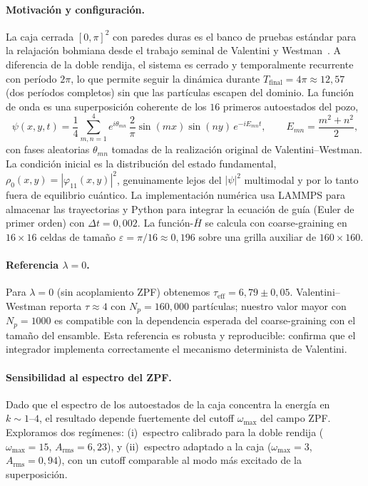 \documentclass[11pt,a4paper]{article}
\begin{document}
\paragraph{Motivación y configuración.}
La caja cerrada $[0,\pi]^2$ con paredes duras es el banco de pruebas
estándar para la relajación bohmiana desde el trabajo seminal de
Valentini y Westman~\cite{ValentiniWestman2005}. A diferencia de la
doble rendija, el sistema es cerrado y temporalmente recurrente con
período $2\pi$, lo que permite seguir la dinámica durante
$T_\text{final}=4\pi\approx 12{,}57$ (dos períodos completos) sin que
las partículas escapen del dominio. La función de onda es una
superposición coherente de los $16$ primeros autoestados del pozo,
\begin{equation}
\psi(x,y,t)=\frac{1}{4}\sum_{m,n=1}^{4}e^{i\theta_{mn}}\,
\frac{2}{\pi}\sin(mx)\sin(ny)\,e^{-iE_{mn}t},
\qquad
E_{mn}=\frac{m^2+n^2}{2},
\label{eq:psi_caja}
\end{equation}
con fases aleatorias $\theta_{mn}$ tomadas de la realización original
de Valentini--Westman. La condición inicial es la distribución del
estado fundamental, $\rho_0(x,y)=|\varphi_{11}(x,y)|^2$, genuinamente
lejos del $|\psi|^2$ multimodal y por lo tanto fuera de equilibrio
cuántico. La implementación numérica usa LAMMPS para almacenar las
trayectorias y Python para integrar la ecuación de guía (Euler de
primer orden) con $\Delta t=0{,}002$. La función-$\bar{H}$ se calcula
con coarse-graining en $16\times 16$ celdas de tamaño
$\varepsilon=\pi/16\approx 0{,}196$ sobre una grilla auxiliar de
$160\times 160$.

\paragraph{Referencia $\lambda=0$.}
Para $\lambda=0$ (sin acoplamiento ZPF) obtenemos
$\tau_\text{eff}=6{,}79\pm 0{,}05$. Valentini--Westman reporta
$\tau\approx 4$ con $N_p=160{,}000$ partículas; nuestro valor mayor con
$N_p=1000$ es compatible con la dependencia esperada del
coarse-graining con el tamaño del ensamble. Esta referencia es robusta
y reproducible: confirma que el integrador implementa correctamente el
mecanismo determinista de Valentini.

\paragraph{Sensibilidad al espectro del ZPF.}
Dado que el espectro de los autoestados de la caja concentra la energía
en $k\sim 1\text{--}4$, el resultado depende fuertemente del cutoff
$\omega_\text{max}$ del campo ZPF. Exploramos dos regímenes:
(i)~espectro calibrado para la doble rendija ($\omega_\text{max}=15$,
$A_\text{rms}=6{,}23$), y (ii)~espectro adaptado a la caja
($\omega_\text{max}=3$, $A_\text{rms}=0{,}94$), con un cutoff
comparable al modo más excitado de la superposición.
\end{document}
